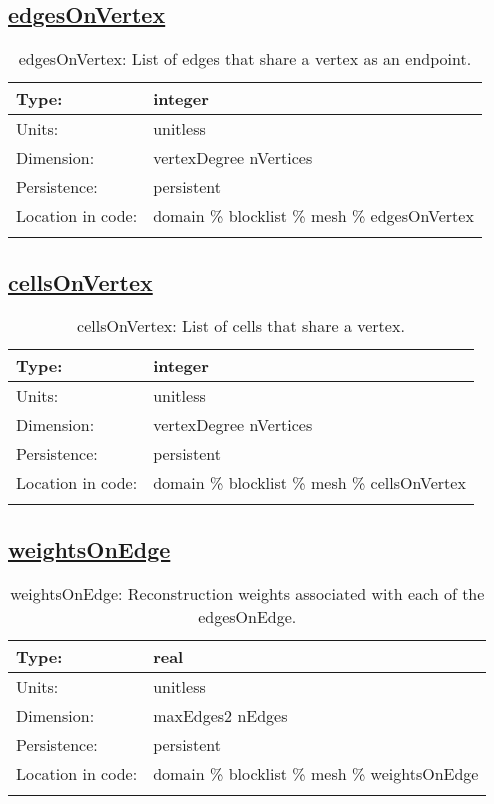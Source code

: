 \subsection[edgesOnVertex]{\hyperref[sec:var_tab_mesh]{edgesOnVertex}}
\label{subsec:var_sec_mesh_edgesOnVertex}
\begin{center}
\begin{longtable}{| p{2.0in} | p{4.0in} |}
        \hline 
        Type: & integer \\
        \hline 
        Units: & \si{unitless} \\
        \hline 
        Dimension: & vertexDegree nVertices \\
        \hline 
        Persistence: & persistent \\
        \hline 
         Location in code: & domain \% blocklist \% mesh \% edgesOnVertex \\
         \hline 
    \caption{edgesOnVertex: List of edges that share a vertex as an endpoint.}
\end{longtable}
\end{center}
\subsection[cellsOnVertex]{\hyperref[sec:var_tab_mesh]{cellsOnVertex}}
\label{subsec:var_sec_mesh_cellsOnVertex}
\begin{center}
\begin{longtable}{| p{2.0in} | p{4.0in} |}
        \hline 
        Type: & integer \\
        \hline 
        Units: & \si{unitless} \\
        \hline 
        Dimension: & vertexDegree nVertices \\
        \hline 
        Persistence: & persistent \\
        \hline 
         Location in code: & domain \% blocklist \% mesh \% cellsOnVertex \\
         \hline 
    \caption{cellsOnVertex: List of cells that share a vertex.}
\end{longtable}
\end{center}
\subsection[weightsOnEdge]{\hyperref[sec:var_tab_mesh]{weightsOnEdge}}
\label{subsec:var_sec_mesh_weightsOnEdge}
\begin{center}
\begin{longtable}{| p{2.0in} | p{4.0in} |}
        \hline 
        Type: & real \\
        \hline 
        Units: & \si{unitless} \\
        \hline 
        Dimension: & maxEdges2 nEdges \\
        \hline 
        Persistence: & persistent \\
        \hline 
         Location in code: & domain \% blocklist \% mesh \% weightsOnEdge \\
         \hline 
    \caption{weightsOnEdge: Reconstruction weights associated with each of the edgesOnEdge.}
\end{longtable}
\end{center}
